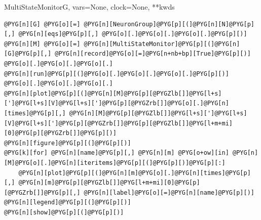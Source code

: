 \documentclass[letterpaper,10pt,english]{manual}
\begin{document}
\begin{classdesc}{MultiStateMonitor}{G, vars=None, clock=None, **kwds}
\begin{Verbatim}[commandchars=@\[\]]
@PYG[n][G] @PYG[o][=] @PYG[n][NeuronGroup]@PYG[p][(]@PYG[n][N]@PYG[p][,] @PYG[n][eqs]@PYG[p][,] @PYG[o][.]@PYG[o][.]@PYG[o][.]@PYG[p][)]
@PYG[n][M] @PYG[o][=] @PYG[n][MultiStateMonitor]@PYG[p][(]@PYG[n][G]@PYG[p][,] @PYG[n][record]@PYG[o][=]@PYG[n+nb+bp][True]@PYG[p][)]
@PYG[o][.]@PYG[o][.]@PYG[o][.]
@PYG[n][run]@PYG[p][(]@PYG[o][.]@PYG[o][.]@PYG[o][.]@PYG[p][)]
@PYG[o][.]@PYG[o][.]@PYG[o][.]
@PYG[n][plot]@PYG[p][(]@PYG[n][M]@PYG[p][@PYGZlb[]]@PYG[l+s][']@PYG[l+s][V]@PYG[l+s][']@PYG[p][@PYGZrb[]]@PYG[o][.]@PYG[n][times]@PYG[p][,] @PYG[n][M]@PYG[p][@PYGZlb[]]@PYG[l+s][']@PYG[l+s][V]@PYG[l+s][']@PYG[p][@PYGZrb[]]@PYG[p][@PYGZlb[]]@PYG[l+m+mi][0]@PYG[p][@PYGZrb[]]@PYG[p][)]
@PYG[n][figure]@PYG[p][(]@PYG[p][)]
@PYG[k][for] @PYG[n][name]@PYG[p][,] @PYG[n][m] @PYG[o+ow][in] @PYG[n][M]@PYG[o][.]@PYG[n][iteritems]@PYG[p][(]@PYG[p][)]@PYG[p][:]
    @PYG[n][plot]@PYG[p][(]@PYG[n][m]@PYG[o][.]@PYG[n][times]@PYG[p][,] @PYG[n][m]@PYG[p][@PYGZlb[]]@PYG[l+m+mi][0]@PYG[p][@PYGZrb[]]@PYG[p][,] @PYG[n][label]@PYG[o][=]@PYG[n][name]@PYG[p][)]
@PYG[n][legend]@PYG[p][(]@PYG[p][)]
@PYG[n][show]@PYG[p][(]@PYG[p][)]
\end{Verbatim}
\end{classdesc}
\end{document}
